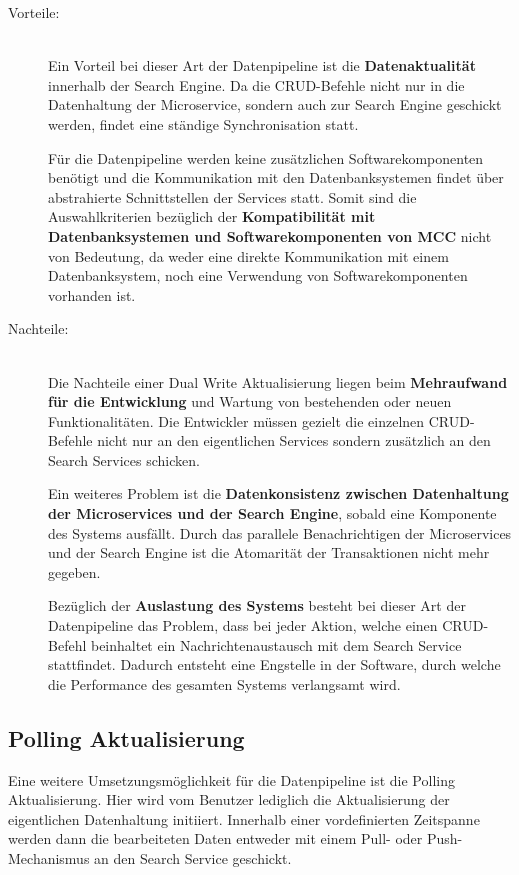 \begin{description}
    \item[Vorteile:]\hfill \\
    Ein Vorteil bei dieser Art der Datenpipeline ist die \textbf{Datenaktualität} innerhalb der Search Engine. Da die CRUD-Befehle nicht nur in die Datenhaltung der Microservice, sondern auch zur Search Engine geschickt werden, findet eine ständige Synchronisation statt.
    
    Für die Datenpipeline werden keine zusätzlichen Softwarekomponenten benötigt und die Kommunikation mit den Datenbanksystemen findet über abstrahierte Schnittstellen der Services statt. Somit sind die Auswahlkriterien bezüglich der \textbf{Kompatibilität mit Datenbanksystemen und Softwarekomponenten von MCC} nicht von Bedeutung, da weder eine direkte Kommunikation mit einem Datenbanksystem, noch eine Verwendung von Softwarekomponenten vorhanden ist.
    
    \item[Nachteile:]\hfill \\
    Die Nachteile einer Dual Write Aktualisierung liegen beim \textbf{Mehraufwand für die Entwicklung} und Wartung von bestehenden oder neuen Funktionalitäten. Die Entwickler müssen gezielt die einzelnen CRUD-Befehle nicht nur an den eigentlichen Services sondern zusätzlich an den Search Services schicken.

    Ein weiteres Problem ist die \textbf{Datenkonsistenz zwischen Datenhaltung der Microservices und der Search Engine}, sobald eine Komponente des Systems ausfällt. Durch das parallele Benachrichtigen der Microservices und der Search Engine ist die Atomarität der Transaktionen nicht mehr gegeben.

    Bezüglich der \textbf{Auslastung des Systems} besteht bei dieser Art der Datenpipeline das Problem, dass bei jeder Aktion, welche einen CRUD-Befehl beinhaltet ein Nachrichtenaustausch mit dem Search Service stattfindet. Dadurch entsteht eine Engstelle in der Software, durch welche die Performance des gesamten Systems verlangsamt wird.

\end{description}

\subsection{Polling Aktualisierung\label{subsec4.3.3:Unterunterpunkt-3}}

Eine weitere Umsetzungsmöglichkeit für die Datenpipeline ist die \glqq Polling Aktualisierung\grqq{}. Hier wird vom Benutzer lediglich die Aktualisierung der eigentlichen Datenhaltung initiiert. Innerhalb einer vordefinierten Zeitspanne werden dann die bearbeiteten Daten entweder mit einem Pull- oder Push-Mechanismus an den Search Service geschickt.

